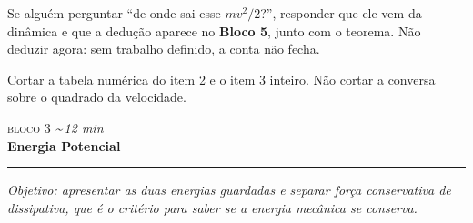\documentclass[11pt,a4paper]{article}
\newcommand{\bloco}[3]{%
  \needspace{7\baselineskip}
  \vspace{1.8em}
  {\scshape\color{vinho}bloco #1}\hfill
    {\small\itshape\color{grafite}\textasciitilde\,#3 min}\\[0.1em]
  {\Large\bfseries #2}\\[-0.55em]
  {\color{black!30}\rule{\linewidth}{0.5pt}}
  \par\nobreak\smallskip
}
\newcommand{\objetivo}[1]{{\itshape\color{grafite}Objetivo: #1}\par\smallskip}
\begin{document}
\begin{obs}
Se algu\'em perguntar ``de onde sai esse $mv^2/2$?'', responder que ele
vem da din\^amica e que a dedu\c{c}\~ao aparece no \textbf{Bloco 5},
junto com o teorema. N\~ao deduzir agora: sem trabalho definido, a
conta n\~ao fecha.
\end{obs}

\begin{corte}
Cortar a tabela num\'erica do item 2 e o item 3 inteiro. N\~ao cortar a
conversa sobre o quadrado da velocidade.
\end{corte}

\bloco{3}{Energia Potencial}{12}

\objetivo{apresentar as duas energias guardadas e separar for\c{c}a
conservativa de dissipativa, que \'e o crit\'erio para saber se a
energia mec\^anica se conserva.}
\end{document}
